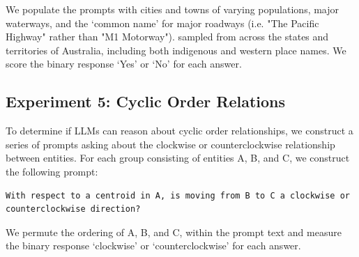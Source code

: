 \noindent We populate the prompts with cities and towns of varying populations, major waterways, and the `common name' for major roadways (i.e. "The Pacific Highway" rather than "M1 Motorway"). sampled from across the states and territories of Australia, including both indigenous and western place names.
We score the binary response `Yes' or `No' for each answer.

\subsection{Experiment 5: Cyclic Order Relations}
To determine if LLMs can reason about cyclic order relationships, we construct a series of prompts asking about the clockwise or counterclockwise relationship between entities.
For each group consisting of entities A, B, and C, we construct the following prompt: 

\begin{lstlisting}[title=Prompt 15: Cyclic Order Relation Prompt]
    With respect to a centroid in A, is moving from B to C a clockwise or counterclockwise direction?
\end{lstlisting}

\noindent We permute the ordering of A, B, and C, within the prompt text and measure the binary response `clockwise' or `counterclockwise' for each answer.










